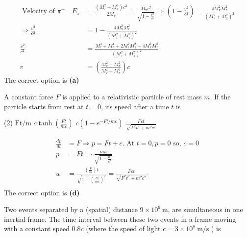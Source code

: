 \begin{enumerate}
\begin{answer}
\begin{align*}
\text { Velocity of } \pi^{-} \quad E_{\pi}&=\frac{\left(M_{\tau}^{2}+M_{\pi}^{2}\right) c^{2}}{2 M_{\tau}}=\frac{M_{\pi} c^{2}}{\sqrt{1-\frac{v^{2}}{c^{2}}}} \Rightarrow\left(1-\frac{v^{2}}{c^{2}}\right)=\frac{4 M_{\pi}^{2} M_{\tau}^{2}}{\left(M_{\tau}^{2}+M_{\pi}^{2}\right)^{2}}\\
\Rightarrow \frac{v^{2}}{c^{2}}&=1-\frac{4 M_{\pi}^{2} M_{\tau}^{2}}{\left(M_{\tau}^{2}+M_{\pi}^{2}\right)^{2}}\\
\frac{v^{2}}{c^{2}}&=\frac{M_{\tau}^{4}+M_{\pi}^{4}+2 M_{\tau}^{2} M_{\pi}^{2}-4 M_{\pi}^{2} M_{\tau}^{2}}{\left(M_{\tau}^{2}+M_{\pi}^{2}\right)^{2}}\\
v&=\left(\frac{M_{\tau}^{2}-M_{\pi}^{2}}{M_{\tau}^{2}+M_{\pi}^{2}}\right) c
\end{align*}
The correct option is \textbf{(a)}	
\end{answer}
\begin{minipage}{\textwidth}
	\item A constant force $F$ is applied to a relativistic particle of rest mass $m$. If the particle starts from rest at $t=0$, its speed after a time $t$ is
\end{minipage}
\begin{tasks}(2)
	\task[\textbf{A.}] $\mathrm{Ft} / \mathrm{m}$
	\task[\textbf{B.}]$c \tanh \left(\frac{F t}{m c}\right)$
	\task[\textbf{C.}]$c\left(1-e^{-F t / m c}\right)$
	\task[\textbf{D.}]$\frac{F c t}{\sqrt{F^{2} t^{2}+m^{2} c^{2}}}$
\end{tasks}
\begin{answer}
	\begin{align*}
	\frac{d p}{d t}&=F \Rightarrow p=F t+c . \text { At } t=0, p=0 \text { so, } c=0\\
	p&=F t \Rightarrow \frac{m u}{\sqrt{1-\frac{u^{2}}{c^{2}}}}\\
	u&=\frac{\left(\frac{F}{m}\right) t}{\sqrt{1+\left(\frac{F t}{m c}\right)^{2}}}=\frac{F c t}{\sqrt{F^{2} t^{2}+m^{2} c^{2}}}\\
	\end{align*}
	The correct option is \textbf{(d)}
\end{answer}
\begin{minipage}{\textwidth}
	\item Two events separated by a (spatial) distance $9 \times 10^{9} \mathrm{~m}$, are simultaneous in one inertial frame. The time interval between these two events in a frame moving with a constant speed $0.8 c$ (where the speed of light $c=3 \times 10^{8} \mathrm{~m} / \mathrm{s}$ ) is

\end{minipage}
\end{enumerate}
